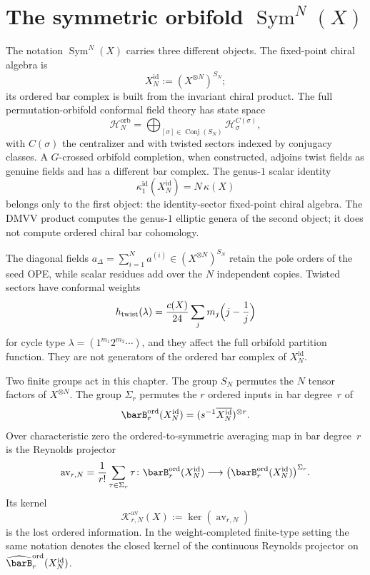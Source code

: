 
\chapter{\texorpdfstring{The symmetric orbifold $\operatorname{Sym}^N(X)$}{The symmetric orbifold Sym\^{}N(X)}}\label{chap:symmetric-orbifold}

The notation $\operatorname{Sym}^N(X)$ carries three different
objects. The fixed-point chiral algebra is
\[
 X_N^{\mathrm{id}} := (X^{\otimes N})^{S_N};
\]
its ordered bar complex is built from the invariant chiral product.
The full permutation-orbifold conformal field theory has state space
\[
 \mathcal H_N^{\mathrm{orb}}
 = \bigoplus_{[\sigma]\in \operatorname{Conj}(S_N)}
 \mathcal H_\sigma^{C(\sigma)} ,
\]
with $C(\sigma)$ the centralizer and with twisted sectors indexed by
conjugacy classes. A
$G$-crossed orbifold completion, when constructed, adjoins twist
fields as genuine fields and has a different bar complex. The
genus-$1$ scalar identity
\[
 \kappa^{\mathrm{id}}_1(X_N^{\mathrm{id}})
 = N\,\kappa(X)
\]
belongs only to the first object: the identity-sector fixed-point
chiral algebra. The DMVV product \cite{DMVV97} computes the
genus-$1$ elliptic genera of the second object; it does not compute
ordered chiral bar cohomology.

The diagonal fields
$a_\Delta=\sum_{i=1}^N a^{(i)}\in (X^{\otimes N})^{S_N}$ retain the
pole orders of the seed OPE, while scalar residues add over the
$N$ independent copies. Twisted sectors have conformal weights
\[
 h_{\mathrm{twist}}(\lambda)
 = \frac{c(X)}{24}\sum_j m_j\Bigl(j-\frac1j\Bigr)
\]
for cycle type $\lambda=(1^{m_1}2^{m_2}\cdots)$, and they affect the
full orbifold partition function. They are not generators of the
ordered bar complex of $X_N^{\mathrm{id}}$.

\begin{definition}
\label{def:symn-averaging-kernel}
Two finite groups act in this chapter. The group $S_N$ permutes the
$N$ tensor factors of $X^{\otimes N}$. The group $\Sigma_r$ permutes
the $r$ ordered inputs in bar degree~$r$ of
\[
 \barB^{\mathrm{ord}}_r(X_N^{\mathrm{id}})
 =
 (s^{-1}\overline{X_N^{\mathrm{id}}})^{\otimes r}.
\]
Over characteristic zero the ordered-to-symmetric averaging map in
bar degree~$r$ is the Reynolds projector
\[
 \operatorname{av}_{r,N}
 =
 \frac{1}{r!}\sum_{\tau\in\Sigma_r}\tau
 \colon
 \barB^{\mathrm{ord}}_r(X_N^{\mathrm{id}})
 \longrightarrow
 \bigl(\barB^{\mathrm{ord}}_r(X_N^{\mathrm{id}})\bigr)^{\Sigma_r}.
\]
Its kernel
\[
 \mathcal K^{\mathrm{av}}_{r,N}(X)
 :=
 \ker(\operatorname{av}_{r,N})
\]
is the lost ordered information. In the weight-completed finite-type
setting the same notation denotes the closed kernel of the continuous
Reynolds projector on
$\widehat{\barB}^{\mathrm{ord}}_r(X_N^{\mathrm{id}})$.
\end{definition}

